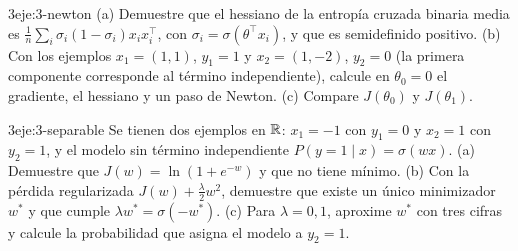 \begin{ejercicio}{3}{eje:3-newton}
(a) Demuestre que el hessiano de la entropía cruzada binaria media es $\frac1n\sum_i\sigma_i(1-\sigma_i)x_ix_i^{\top}$, con $\sigma_i=\sigma(\theta^{\top}x_i)$, y que es semidefinido positivo. (b) Con los ejemplos $x_1=(1,1)$, $y_1=1$ y $x_2=(1,-2)$, $y_2=0$ (la primera componente corresponde al término independiente), calcule en $\theta_0=0$ el gradiente, el hessiano y un paso de Newton. (c) Compare $J(\theta_0)$ y $J(\theta_1)$.
\end{ejercicio}

\begin{ejercicio}{3}{eje:3-separable}
Se tienen dos ejemplos en $\mathbb{R}$: $x_1=-1$ con $y_1=0$ y $x_2=1$ con $y_2=1$, y el modelo sin término independiente $P(y=1\mid x)=\sigma(wx)$. (a) Demuestre que $J(w)=\ln(1+e^{-w})$ y que no tiene mínimo. (b) Con la pérdida regularizada $J(w)+\frac{\lambda}{2}w^{2}$, demuestre que existe un único minimizador $w^{*}$ y que cumple $\lambda w^{*}=\sigma(-w^{*})$. (c) Para $\lambda=0{,}1$, aproxime $w^{*}$ con tres cifras y calcule la probabilidad que asigna el modelo a $y_2=1$.
\end{ejercicio}
